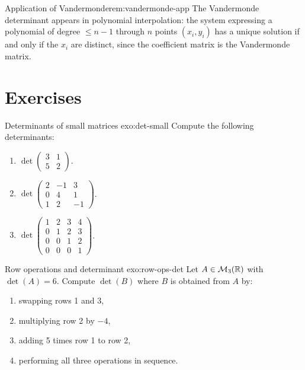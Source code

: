 \begin{remark}{Application of Vandermonde}{rem:vandermonde-app}
The Vandermonde determinant appears in polynomial interpolation:
the system expressing a polynomial of degree $\leq n-1$ through
$n$ points $(x_i,y_i)$ has a unique solution if and only if
the $x_i$ are distinct, since the coefficient matrix is the
Vandermonde matrix.
\end{remark}


\section{Exercises}\label{sec:det-exercises}

\begin{exercise}{Determinants of small matrices \basic}{exo:det-small}
Compute the following determinants:
\begin{enumerate}[label=(\alph*)]
  \item $\det\begin{pmatrix}3 & 1 \\ 5 & 2\end{pmatrix}$.
  \item $\det\begin{pmatrix}2 & -1 & 3 \\ 0 & 4 & 1 \\ 1 & 2 & -1\end{pmatrix}$.
  \item $\det\begin{pmatrix}1 & 2 & 3 & 4 \\ 0 & 1 & 2 & 3 \\
    0 & 0 & 1 & 2 \\ 0 & 0 & 0 & 1\end{pmatrix}$.
\end{enumerate}
\end{exercise}

\begin{exercise}{Row operations and determinant \basic}{exo:row-ops-det}
Let $A\in\mathcal{M}_3({\mathbb{R}})$ with $\det(A)=6$. Compute $\det(B)$ where $B$ is
obtained from $A$ by:
\begin{enumerate}[label=(\alph*)]
  \item swapping rows 1 and 3,
  \item multiplying row 2 by $-4$,
  \item adding 5 times row 1 to row 2,
  \item performing all three operations in sequence.
\end{enumerate}
\end{exercise}

